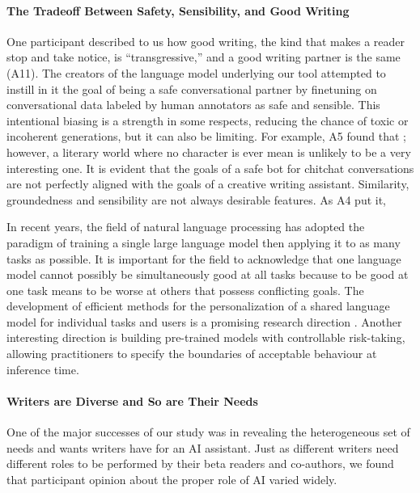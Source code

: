 \paragraph{The Tradeoff Between Safety, Sensibility, and Good Writing}
One participant described to us how good writing, the kind that makes a reader stop and take notice, is ``transgressive,” and a good writing partner is the same (A11).
The creators of the language model underlying our tool attempted to instill in it the goal of being a safe conversational partner by finetuning on conversational data labeled by human annotators as safe and sensible.
This intentional biasing is a strength in some respects, reducing the chance of toxic or incoherent generations, but it can also be limiting.
For example, A5 found that ; however, a literary world where no character is ever mean is unlikely to be a very interesting one.
It is evident that the goals of a safe bot for chitchat conversations are not perfectly aligned with the goals of a creative writing assistant.
Similarity, groundedness and sensibility are not always desirable features.
As A4 put it, 

In recent years, the field of natural language processing has adopted the paradigm of training a single large language model then applying it to as many tasks as possible.
It is important for the field to acknowledge that one language model cannot possibly be simultaneously good at all tasks because to be good at one task means to be worse at others that possess conflicting goals.
The development of efficient methods for the personalization of a shared language model for individual tasks and users is a promising research direction \citep{lester2021power,li2021prefix}.
Another interesting direction is building pre-trained models with controllable risk-taking, allowing practitioners to specify the boundaries of acceptable behaviour at inference time.

\paragraph{Writers are Diverse and So are Their Needs}
One of the major successes of our study was in revealing the heterogeneous set of needs and wants writers have for an AI assistant.
Just as different writers need different roles to be performed by their beta readers and co-authors, we found that participant opinion about the proper role of AI varied widely.

